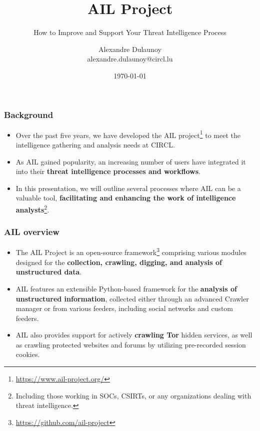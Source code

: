 \documentclass{beamer}
\author{\large{Alexandre Dulaunoy}\\ \scriptsize{alexandre.dulaunoy@circl.lu}}
\title{AIL Project}
\subtitle{How to Improve and Support Your Threat Intelligence Process}
\institute{info@circl.lu}
\date{\today}
\begin{document}
\begin{frame}[t,plain]
\titlepage
\end{frame}

\begin{frame}
    \frametitle{Background}
    \begin{itemize}
        \item Over the past five years, we have developed the AIL project\footnote{\url{https://www.ail-project.org/}} to meet the intelligence gathering and analysis needs at CIRCL.
        \item As AIL gained popularity, an increasing number of users have integrated it into their {\bf threat intelligence processes and workflows}.
        \item In this presentation, we will outline several processes where AIL can be a valuable tool, {\bf facilitating and enhancing the work of intelligence analysts}\footnote{Including those working in SOCs, CSIRTs, or any organizations dealing with threat intelligence.}.
    \end{itemize}
\end{frame}

\begin{frame}
   \frametitle{AIL overview}
    \begin{itemize}
        \item The AIL Project is an open-source framework\footnote{\url{https://github.com/ail-project}} comprising various modules designed for the {\bf collection, crawling, digging, and analysis of unstructured data}.
        \item AIL features an extensible Python-based framework for the {\bf analysis of unstructured information}, collected either through an advanced Crawler manager or from various feeders, including social networks and custom feeders.
        \item AIL also provides support for actively {\bf crawling Tor} hidden services, as well as crawling protected websites and forums by utilizing pre-recorded session cookies.
    \end{itemize}
\end{frame}
\end{document}
